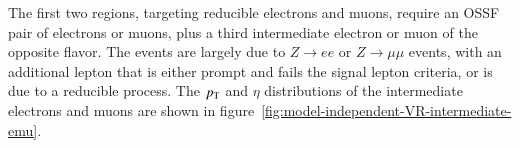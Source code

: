 The first two regions, targeting reducible electrons and muons, require an OSSF pair of electrons or muons, plus a third intermediate electron or muon of the opposite flavor. The events are largely due to $Z\rightarrow ee$ or $Z\rightarrow \mu\mu$ events, with an additional lepton that is either prompt and fails the signal lepton criteria, or is due to a reducible process. The $p_{\text{T}}$ and $\eta$ distributions of the intermediate electrons and muons are shown in figure~\ref{fig:model-independent-VR-intermediate-emu}.

\begin{figure}[htbp]
  \centering
  \hfill
\end{figure}
